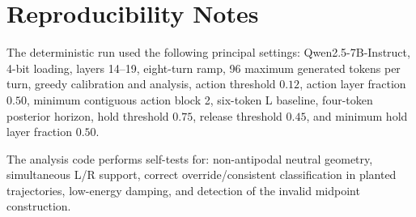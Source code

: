 \documentclass[10pt]{article}
\begin{document}
\section*{Reproducibility Notes}

The deterministic run used the following principal settings: Qwen2.5-7B-Instruct, 4-bit loading, layers 14--19, eight-turn ramp, 96 maximum generated tokens per turn, greedy calibration and analysis, action threshold $0.12$, action layer fraction $0.50$, minimum contiguous action block 2, six-token L baseline, four-token posterior horizon, hold threshold $0.75$, release threshold $0.45$, and minimum hold layer fraction $0.50$.

The analysis code performs self-tests for: non-antipodal neutral geometry, simultaneous L/R support, correct override/consistent classification in planted trajectories, low-energy damping, and detection of the invalid midpoint construction.
\end{document}
